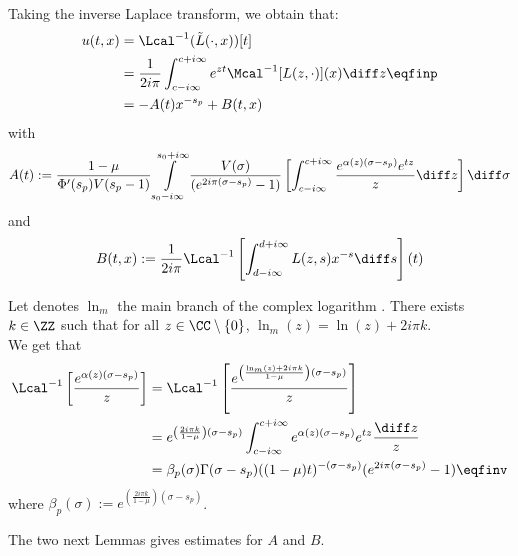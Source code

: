 Taking the inverse Laplace transform, we obtain that: 
\begin{align*}
     u(t,x) &= \Lcal^{-1}(\tilde L(\cdot, x))[t] \\
     &= \frac{1}{2i\pi } \int_{c-i\infty}^{c+i\infty} e^{zt}\Mcal^{-1}[L(z,\cdot)](x) \diff z
     \eqfinp\\
     &= -A(t)x^{-s_p} + B(t,x)
\end{align*}
with 
\begin{equation}
    A(t) :=\frac{1-\mu}{\Phi'(s_p) V(s_p-1)}
     \int\limits_{s_0-i\infty}^{s_0+i\infty}
     \frac{V(\sigma)
  }{(e^{2i\pi(\sigma-s_p)}-1)} \left[\int_{c-i\infty}^{c+i\infty} \frac{e^{ \alpha(z)(\sigma-s_p)}e^{tz}}{z}\diff z \right] \diff \sigma
  \label{def:A} 
\end{equation}
and 
\begin{equation}
    B(t,x) := \frac{1}{2i\pi} \Lcal^{-1}\left[\int_{d-i\infty}^{d+i\infty} L(z,s)x^{-s}\diff s \right] (t)
\label{def:B}
\end{equation}

Let denotes $\ln_{m}$  the main branch of the complex logarithm . There exists $k \in \ZZ$ such that for all $z \in \CC \setminus \{0\}$, $\ln_m(z) = \ln(z) + 2i\pi k. $ \\
We get that 
\begin{subequations}
\begin{align}
    \Lcal^{-1}\left[ \frac{e^{ \alpha(z)(\sigma-s_p)}}{z}  \right]
    &= 
    \Lcal^{-1}\left[ \frac{e^{ \left( \frac{\ln_m(z) + 2i\pi k}{1-\mu} \right) (\sigma-s_p)}}{z}  \right] \\
    &= 
    e^{ \left( \frac{2i\pi k}{1-\mu} \right) (\sigma-s_p)}
    \int_{c-i\infty}^{c+i\infty} e^{ \alpha(z)(\sigma-s_p)}e^{tz}\frac{\diff z}{z}\\
    &= \beta_p(\sigma) \Gamma(\sigma-s_p)((1-\mu)t)^{-(\sigma-s_p)}(e^{2i\pi(\sigma-s_p)}-1)
    \eqfinv
\end{align}
\label{eq:calcLaplInv}
\end{subequations}
where $\beta_p(\sigma) := e^{ \left( \frac{2i\pi k}{1-\mu} \right) (\sigma-s_p)}$. 

The two next Lemmas gives estimates for $A$ and $B$. 

